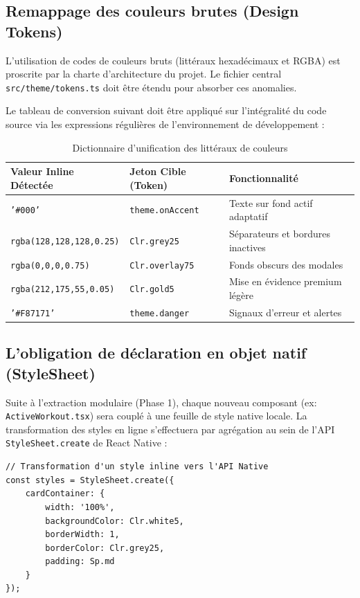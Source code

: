 \documentclass[11pt, a4paper]{article}
\begin{document}
\subsection{Remappage des couleurs brutes (Design Tokens)}
L'utilisation de codes de couleurs bruts (littéraux hexadécimaux et RGBA) est proscrite par la charte d'architecture du projet. Le fichier central \texttt{src/theme/tokens.ts} doit être étendu pour absorber ces anomalies.

Le tableau de conversion suivant doit être appliqué sur l'intégralité du code source via les expressions régulières de l'environnement de développement :

\begin{table}[htbp]
\centering
\caption{Dictionnaire d'unification des littéraux de couleurs}
\label{tab:color_mapping}
\begin{tabularx}{\textwidth}{@{}lXl@{}}
\toprule
\textbf{Valeur Inline Détectée} & \textbf{Jeton Cible (Token)} & \textbf{Fonctionnalité} \\ \midrule
\texttt{'\#000'} & \texttt{theme.onAccent} & Texte sur fond actif adaptatif \\
\texttt{rgba(128,128,128,0.25)} & \texttt{Clr.grey25} & Séparateurs et bordures inactives \\
\texttt{rgba(0,0,0,0.75)} & \texttt{Clr.overlay75} & Fonds obscurs des modales \\
\texttt{rgba(212,175,55,0.05)} & \texttt{Clr.gold5} & Mise en évidence premium légère \\
\texttt{'\#F87171'} & \texttt{theme.danger} & Signaux d'erreur et alertes \\ \bottomrule
\end{tabularx}
\end{table}

\subsection{L'obligation de déclaration en objet natif (StyleSheet)}
Suite à l'extraction modulaire (Phase 1), chaque nouveau composant (ex: \texttt{ActiveWorkout.tsx}) sera couplé à une feuille de style native locale.
La transformation des styles en ligne s'effectuera par agrégation au sein de l'API \texttt{StyleSheet.create} de React Native :

\begin{verbatim}
// Transformation d'un style inline vers l'API Native
const styles = StyleSheet.create({
    cardContainer: {
        width: '100%',
        backgroundColor: Clr.white5,
        borderWidth: 1,
        borderColor: Clr.grey25,
        padding: Sp.md
    }
});
\end{verbatim}
\end{document}
